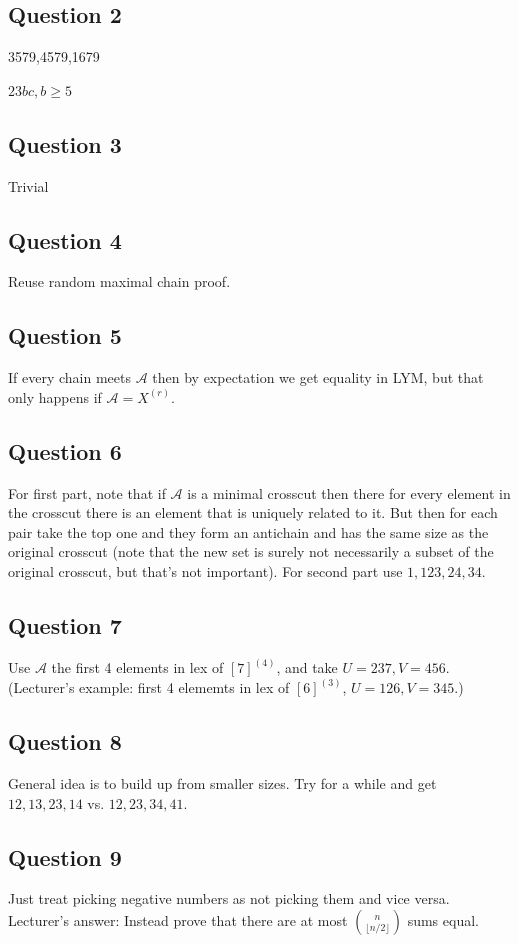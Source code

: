 \documentclass[a4paper]{article}
\begin{document}
\subsection{Question 2}
3579,4579,1679

$23bc, b \geq 5$

\subsection{Question 3}
Trivial

\subsection{Question 4}
Reuse random maximal chain proof.

\subsection{Question 5}
If every chain meets $\mathcal{A}$ then by expectation we get equality in LYM, but that only happens if $\mathcal{A} = X^{(r)}$.

\subsection{Question 6}
For first part, note that if $\mathcal{A}$ is a minimal crosscut then there for every element in the crosscut there is an element that is uniquely related to it. But then for each pair take the top one and they form an antichain and has the same size as the original crosscut (note that the new set is surely not necessarily a subset of the original crosscut, but that's not important).
For second part use $1,123,24,34$.

\subsection{Question 7}
Use $\mathcal{A}$ the first 4 elements in lex of $[7]^{(4)}$, and take $U=237, V=456$.\\
(Lecturer's example: first 4 elememts in lex of $[6]^{(3)}$, $U=126, V=345$.)

\subsection{Question 8}
General idea is to build up from smaller sizes. Try for a while and get $12,13,23,14$ vs. $12,23,34,41$.

\subsection{Question 9}
Just treat picking negative numbers as not picking them and vice versa.\\
Lecturer's answer: Instead prove that there are at most ${n \choose {\lfloor n/2 \rfloor}}$ sums equal.
\end{document}
